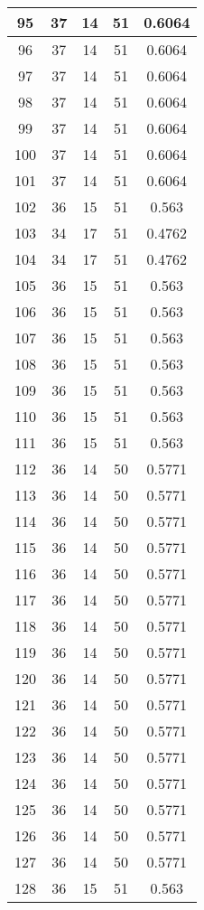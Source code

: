 \documentclass[letterpaper, 12pt]{article}
\begin{document}
\begin{longtable}{|c|c|c|c|c|}
\hline
95 & 37 & 14 & 51 & 0.6064 \\
\hline
96 & 37 & 14 & 51 & 0.6064 \\
\hline
97 & 37 & 14 & 51 & 0.6064 \\
\hline
98 & 37 & 14 & 51 & 0.6064 \\
\hline
99 & 37 & 14 & 51 & 0.6064 \\
\hline
100 & 37 & 14 & 51 & 0.6064 \\
\hline
101 & 37 & 14 & 51 & 0.6064 \\
\hline
102 & 36 & 15 & 51 & 0.563 \\
\hline
103 & 34 & 17 & 51 & 0.4762 \\
\hline
104 & 34 & 17 & 51 & 0.4762 \\
\hline
105 & 36 & 15 & 51 & 0.563 \\
\hline
106 & 36 & 15 & 51 & 0.563 \\
\hline
107 & 36 & 15 & 51 & 0.563 \\
\hline
108 & 36 & 15 & 51 & 0.563 \\
\hline
109 & 36 & 15 & 51 & 0.563 \\
\hline
110 & 36 & 15 & 51 & 0.563 \\
\hline
111 & 36 & 15 & 51 & 0.563 \\
\hline
112 & 36 & 14 & 50 & 0.5771 \\
\hline
113 & 36 & 14 & 50 & 0.5771 \\
\hline
114 & 36 & 14 & 50 & 0.5771 \\
\hline
115 & 36 & 14 & 50 & 0.5771 \\
\hline
116 & 36 & 14 & 50 & 0.5771 \\
\hline
117 & 36 & 14 & 50 & 0.5771 \\
\hline
118 & 36 & 14 & 50 & 0.5771 \\
\hline
119 & 36 & 14 & 50 & 0.5771 \\
\hline
120 & 36 & 14 & 50 & 0.5771 \\
\hline
121 & 36 & 14 & 50 & 0.5771 \\
\hline
122 & 36 & 14 & 50 & 0.5771 \\
\hline
123 & 36 & 14 & 50 & 0.5771 \\
\hline
124 & 36 & 14 & 50 & 0.5771 \\
\hline
125 & 36 & 14 & 50 & 0.5771 \\
\hline
126 & 36 & 14 & 50 & 0.5771 \\
\hline
127 & 36 & 14 & 50 & 0.5771 \\
\hline
128 & 36 & 15 & 51 & 0.563 \\

\end{longtable}
\end{document}
